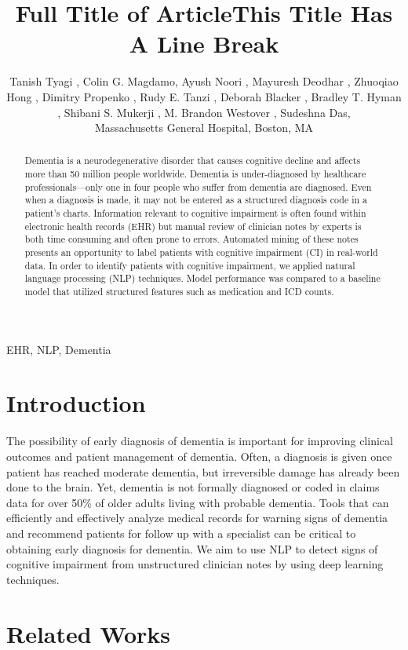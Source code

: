 \documentclass[pmlr,twocolumn,10pt]{jmlr} %
\title[Short Title]{Full Title of Article\titlebreak This Title Has
A Line Break}
\author{Tanish Tyagi \nametag{\thanks{Authors contributed equally}\SUP{1}},
Colin G. Magdamo\nametag{\footnotemark[1]\SUP{1}}, 
Ayush Noori \SUP{1},
Mayuresh Deodhar \SUP{1},
Zhuoqiao Hong \SUP{1},
Dimitry Propenko \SUP{1},
Rudy E. Tanzi \SUP{1},
Deborah Blacker \SUP{1},
Bradley T. Hyman \SUP{1},
Shibani S. Mukerji \SUP{1},
M. Brandon Westover \SUP{1},
Sudeshna Das\SUP{1},
\centering \Email{
\\[\bigskipamount] 
\SUP{1}\{ttanish, 
cmagdamo,
anoori1,
...
sdas5\}
@mgh.harvard.edu}
% 
\begin{center}\addr Massachusetts General Hospital, Boston, MA\end{center}
}
\begin{document}
\maketitle

\begin{abstract}
\hspace{10mm} Dementia is a neurodegenerative disorder that causes cognitive decline and affects more than 50 million people worldwide. Dementia is under-diagnosed by healthcare professionals—only one in four people who suffer from dementia are diagnosed. Even when a diagnosis is made, it may not be entered as a structured diagnosis code in a patient’s charts.  Information relevant to cognitive impairment is often found within electronic health records (EHR) but manual review of clinician notes by experts is both time consuming and often prone to errors. Automated mining of these notes presents an opportunity to label patients with cognitive impairment (CI) in real-world data. In order to identify patients with cognitive impairment, we applied natural language processing (NLP) techniques. Model performance was compared to a baseline model that utilized structured features such as medication and ICD counts. %
\end{abstract}

\begin{keywords}
EHR, NLP, Dementia
\end{keywords}

\section{Introduction}
\label{sec:intro} The possibility of early diagnosis of dementia is important for improving clinical outcomes and patient management of dementia. Often, a diagnosis is given once patient has reached moderate dementia, but irreversible damage has already been done to the brain. 
Yet, dementia is not formally diagnosed or coded in claims data for over 50\% of older adults living with probable dementia. Tools that can efficiently and effectively analyze medical records for warning signs of dementia and recommend patients for follow up with a specialist can be critical to obtaining early diagnosis for dementia. We aim to use NLP to detect signs of cognitive impairment from unstructured clinician notes by using deep learning techniques. 

\section{Related Works}
\label{sec:RelatedWorks}
\end{document}
